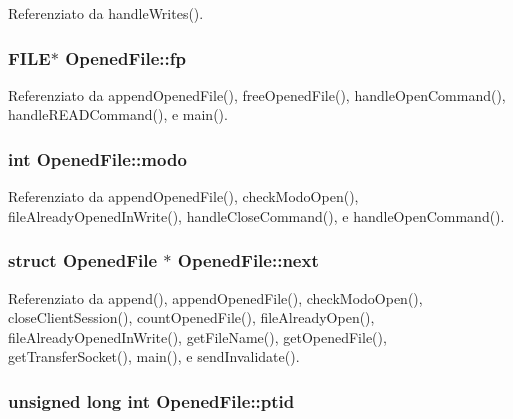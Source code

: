 Referenziato da handle\+Writes().

\hypertarget{structOpenedFile_a9cdcaccacb2eb66a17c0781666c28b15}{
\subsubsection[{fp}]{\setlength{\rightskip}{0pt plus 5cm}F\+I\+L\+E$\ast$ Opened\+File\+::fp}}\label{structOpenedFile_a9cdcaccacb2eb66a17c0781666c28b15}


Referenziato da append\+Opened\+File(), free\+Opened\+File(), handle\+Open\+Command(), handle\+R\+E\+A\+D\+Command(), e main().

\hypertarget{structOpenedFile_a6d9f22ff6ba81506ba9c4a60f27c4f32}{
\subsubsection[{modo}]{\setlength{\rightskip}{0pt plus 5cm}int Opened\+File\+::modo}}\label{structOpenedFile_a6d9f22ff6ba81506ba9c4a60f27c4f32}


Referenziato da append\+Opened\+File(), check\+Modo\+Open(), file\+Already\+Opened\+In\+Write(), handle\+Close\+Command(), e handle\+Open\+Command().

\hypertarget{structOpenedFile_a9b8c8b995cdda6da249a6ce9a9df98b2}{
\subsubsection[{next}]{\setlength{\rightskip}{0pt plus 5cm}struct {\bf Opened\+File} $\ast$ Opened\+File\+::next}}\label{structOpenedFile_a9b8c8b995cdda6da249a6ce9a9df98b2}


Referenziato da append(), append\+Opened\+File(), check\+Modo\+Open(), close\+Client\+Session(), count\+Opened\+File(), file\+Already\+Open(), file\+Already\+Opened\+In\+Write(), get\+File\+Name(), get\+Opened\+File(), get\+Transfer\+Socket(), main(), e send\+Invalidate().

\hypertarget{structOpenedFile_a33cb5376fd14129a1635cf142c0781a6}{
\subsubsection[{ptid}]{\setlength{\rightskip}{0pt plus 5cm}unsigned long int Opened\+File\+::ptid}}\label{structOpenedFile_a33cb5376fd14129a1635cf142c0781a6}


